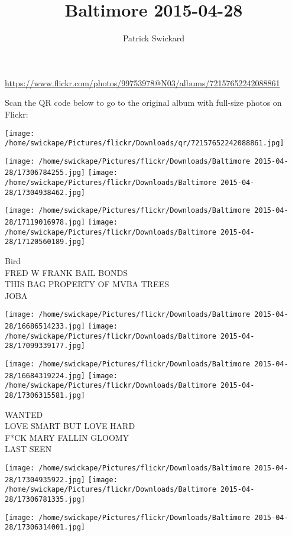 \documentclass[10pt,letterpaper]{article}
\title{Baltimore 2015-04-28}
\author{Patrick Swickard}
\date{}
\begin{document}
\maketitle

\url{https://www.flickr.com/photos/99753978@N03/albums/72157652242088861}

Scan the QR code below to go to the original album with full-size photos on Flickr:

\texttt{[image: /home/swickape/Pictures/flickr/Downloads/qr/72157652242088861.jpg]}
\pagebreak

\texttt{[image: /home/swickape/Pictures/flickr/Downloads/Baltimore 2015-04-28/17306784255.jpg]}
\texttt{[image: /home/swickape/Pictures/flickr/Downloads/Baltimore 2015-04-28/17304938462.jpg]}

\texttt{[image: /home/swickape/Pictures/flickr/Downloads/Baltimore 2015-04-28/17119016978.jpg]}
\texttt{[image: /home/swickape/Pictures/flickr/Downloads/Baltimore 2015-04-28/17120560189.jpg]}

Bird\\
FRED W FRANK BAIL BONDS\\
THIS BAG PROPERTY OF MVBA TREES\\
JOBA
\pagebreak

\texttt{[image: /home/swickape/Pictures/flickr/Downloads/Baltimore 2015-04-28/16686514233.jpg]}
\texttt{[image: /home/swickape/Pictures/flickr/Downloads/Baltimore 2015-04-28/17099339177.jpg]}

\texttt{[image: /home/swickape/Pictures/flickr/Downloads/Baltimore 2015-04-28/16684319224.jpg]}
\texttt{[image: /home/swickape/Pictures/flickr/Downloads/Baltimore 2015-04-28/17306315581.jpg]}

WANTED\\
LOVE SMART BUT LOVE HARD\\
F*CK MARY FALLIN GLOOMY\\
LAST SEEN
\pagebreak

\texttt{[image: /home/swickape/Pictures/flickr/Downloads/Baltimore 2015-04-28/17304935922.jpg]}
\texttt{[image: /home/swickape/Pictures/flickr/Downloads/Baltimore 2015-04-28/17306781335.jpg]}

\vspace{0.25in}
\texttt{[image: /home/swickape/Pictures/flickr/Downloads/Baltimore 2015-04-28/17306314001.jpg]}
\end{document}
